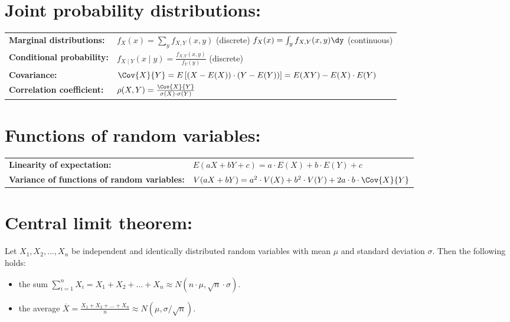 \documentclass[11pt,a4paper,english]{article} %
\begin{document}
\section*{Joint probability distributions:}
\begin{center}
    \renewcommand{\arraystretch}{1.5}
    \begin{tabular}{lm{}}
            \textbf{Marginal distributions:}    & $f_X(x) = \sum_{y} f_{X,Y}(x,y)$ (discrete) \newline $f_X(x) = \int_{y} f_{X,Y}(x,y) \dy$ (continuous) \\
            \textbf{Conditional probability:}   & $f_{X \mid Y}(x \mid y) = \frac{f_{X,Y}(x,y)}{f_Y(y)}$ (discrete) \\
            \textbf{Covariance:}                & $\Cov{X}{Y} = E\left[ (X-E(X)) \cdot (Y - E(Y))\right] = E(XY) - E(X) \cdot E(Y)$ \\
            \textbf{Correlation coefficient:}   & $\rho(X,Y) = \frac{\Cov{X}{Y}}{\sigma(X) \cdot \sigma(Y)}$ \\        
    \end{tabular}   
\end{center}

\section*{Functions of random variables:}
\begin{center}
    \renewcommand{\arraystretch}{1.5}
    \begin{tabular}{m{}m{}}
            \textbf{Linearity of \newline expectation:}  & $E(aX+bY+c) = a \cdot E(X) + b \cdot E(Y) + c $ \\
            \textbf{Variance of functions \newline of random variables:} & $V(aX+bY) = a^2 \cdot V(X) + b^2 \cdot V(Y) + 2a\cdot b\cdot  \Cov{X}{Y}$ \\
    \end{tabular}  
\end{center}

\section*{Central limit theorem:}
Let $X_1, X_2, \ldots, X_n$ be independent and identically distributed random variables with mean $\mu$ and standard deviation $\sigma$.
Then the following holds:
\begin{itemize}
    \item the sum $\sum_{i=1}^{n} X_i = X_1 + X_2 + \ldots + X_n \approx N(n \cdot \mu, \sqrt{n} \cdot \sigma)$.
    \item the average $\overline{X} = \frac{X_1 + X_2 + \ldots + X_n}{n} \approx N(\mu, \sigma / \sqrt{n})$.
\end{itemize}
\end{document}
